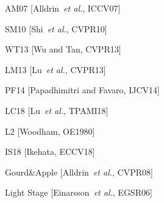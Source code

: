 \documentclass[landscape,a0paper,fontscale=0.292]{baposter}
\begin{document}
\begin{poster}
{\begin{minipage}[t]{0.28\textwidth}
\begin{enumerate}[label={[\arabic*]}]
            \item AM07 [Alldrin~\emph{et al.}, ICCV07]
            \item SM10 [Shi~\emph{et al.}, CVPR10]
            \item WT13 [Wu and Tan, CVPR13]
            \item LM13 [Lu~\emph{et al.}, CVPR13]
            \item PF14 [Papadhimitri and Favaro, IJCV14]
            \item LC18 [Lu~\emph{et al.}, TPAMI18]
            \item L2 [Woodham, OE1980]
            \item IS18 [Ikehata, ECCV18]
            \item Gourd\&Apple [Alldrin~\emph{et al.}, CVPR08]
            \item Light Stage [Einarsson~\emph{et al.}, EGSR06]
        \end{enumerate}
    \end{minipage}
}
\end{poster}
\end{document}
